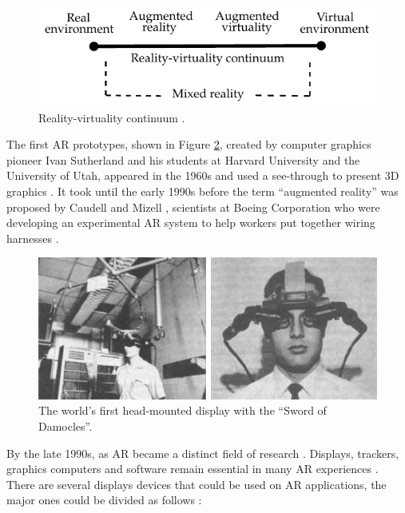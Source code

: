 \begin{figure}[!htb]
  \centering
  \includegraphics{chapters/basic_concepts/reality_continuum.pdf}
  \caption{Reality-virtuality continuum \cite{Benford1998}.}
  \label{figure:reality_continuum}
\end{figure}

The first AR prototypes, shown in Figure \ref{figure:first_head_mount}, created by computer graphics pioneer Ivan Sutherland and his students at Harvard University and the University of Utah, appeared in the 1960s and used a see-through to present 3D graphics \cite{Benford1998}. It took until the early 1990s before the term ``augmented reality'' was proposed by Caudell and Mizell \cite{Benford1998}, scientists at Boeing Corporation who were developing an experimental AR system to help workers put together wiring harnesses \cite{Benford1998}.

\begin{figure}[!htb]
  \centering
  \includegraphics[width=380pt]{chapters/basic_concepts/first_head_mount.png}
  \caption{The world's first head-mounted display with the ``Sword of Damocles''.}
  \label{figure:first_head_mount}
\end{figure}

By the late 1990s, as AR became a distinct field of research \cite{Krevelen2010}. Displays, trackers, graphics computers and software remain essential in many AR experiences \cite{Krevelen2010,Benford1998}. There are several displays devices that could be used on AR applications, the major ones could be divided as follows \cite{Benford1998}:

